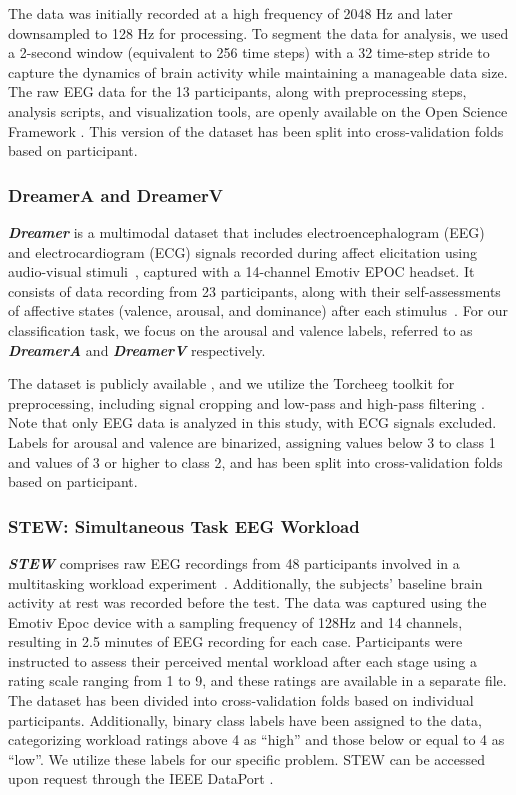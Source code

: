 \documentclass[twoside,11pt,preprint]{article}
\begin{document}
The data was initially recorded at a high frequency of 2048 Hz and later downsampled to 128 Hz for processing. To segment the data for analysis, we used a 2-second window (equivalent to 256 time steps) with a 32 time-step stride to capture the dynamics of brain activity while maintaining a manageable data size. The raw EEG data for the 13 participants, along with preprocessing steps, analysis scripts, and visualization tools, are openly available on the Open Science Framework \citep{data_crowdsourced_2022}. This version of the dataset has been split into cross-validation folds based on participant.

\subsubsection{DreamerA and DreamerV}
\textbf{\textit{Dreamer}} is a multimodal dataset that includes electroencephalogram (EEG) and electrocardiogram (ECG) signals recorded during affect elicitation using audio-visual stimuli~\citep{dreamer}, captured with a 14-channel Emotiv EPOC headset. It consists of data recording from 23 participants, along with their self-assessments of affective states (valence, arousal, and dominance) after each stimulus~\citep{dreamer}. For our classification task, we focus on the arousal and valence labels, referred to as \textbf{\textit{DreamerA}} and \textbf{\textit{DreamerV}} respectively.

The dataset is publicly available \citep{data_dreamer_2017}, and we utilize the Torcheeg toolkit for preprocessing, including signal cropping and low-pass and high-pass filtering \citep{zhang_etal_2024}. Note that only EEG data is analyzed in this study, with ECG signals excluded. Labels for arousal and valence are binarized, assigning values below 3 to class 1 and values of 3 or higher to class 2, and has been split into cross-validation folds based on participant.

\subsubsection{STEW: Simultaneous Task EEG Workload}
\textbf{\textit{STEW}} comprises raw EEG recordings from 48 participants involved in a multitasking workload experiment~\citep{stew}. Additionally, the subjects' baseline brain activity at rest was recorded before the test. The data was captured using the Emotiv Epoc device with a sampling frequency of 128Hz and 14 channels, resulting in 2.5 minutes of EEG recording for each case. Participants were instructed to assess their perceived mental workload after each stage using a rating scale ranging from 1 to 9, and these ratings are available in a separate file. The dataset has been divided into cross-validation folds based on individual participants. Additionally, binary class labels have been assigned to the data, categorizing workload ratings above 4 as ``high'' and those below or equal to 4 as ``low''. We utilize these labels for our specific problem. STEW can be accessed upon request through the IEEE DataPort \citep{data_stew_2022}.
\end{document}
